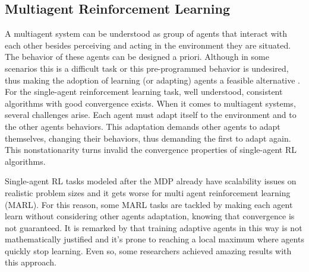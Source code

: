 \documentclass[12pt]{article}
\begin{document}
\subsection{Multiagent Reinforcement Learning}
A multiagent system can be understood as group of agents that interact with each other besides perceiving and acting in the environment they are situated. The behavior of these agents can be designed a priori. Although in some scenarios this is a difficult task or this pre-programmed behavior is undesired, thus making the adoption of learning (or adapting) agents a feasible alternative \cite{Busoniu+2008}.
For the single-agent reinforcement learning task, well understood, consistent algorithms with good convergence exists. When it comes to multiagent systems, several challenges arise. Each agent must adapt itself to the environment and to the other agents behaviors. This adaptation demands other agents to adapt themselves, changing their behaviors, thus demanding the first to adapt again. This nonstationarity turns invalid the convergence properties of single-agent RL algorithms.


Single-agent RL tasks modeled after the MDP already have scalability issues on realistic problem sizes and it gets worse for multi agent reinforcement learning (MARL). For this reason, some MARL tasks are tackled by making each agent learn without considering other agents adaptation, knowing that convergence is not guaranteed. It is remarked by \cite{Littman1994} that training adaptive agents in this way is not mathematically justified and it's prone to reaching a local maximum where agents quickly stop learning. Even so, some researchers achieved amazing results with this approach.
\end{document}
